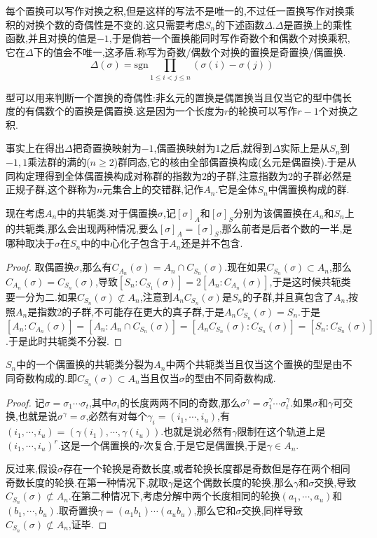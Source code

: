 每个置换可以写作对换之积,但是这样的写法不是唯一的,不过任一置换写作对换乘积的对换个数的奇偶性是不变的.这只需要考虑$S_n$的下述函数$\Delta$.$\Delta$是置换上的乘性函数,并且对换的值是$-1$,于是倘若一个置换能同时写作奇数个和偶数个对换乘积,它在$\Delta$下的值会不唯一,这矛盾.称写为奇数/偶数个对换的置换是奇置换/偶置换.
$$\Delta(\sigma)=\mathrm{sgn}\prod_{1\le i<j\le n}(\sigma(i)-\sigma(j))$$

型可以用来判断一个置换的奇偶性:非幺元的置换是偶置换当且仅当它的型中偶长度的有偶数个的置换是偶置换.这是因为一个长度为$r$的轮换可以写作$r-1$个对换之积.

事实上在得出$\Delta$把奇置换映射为$-1$,偶置换映射为1之后,就得到$\Delta$实际上是从$S_n$到${-1,1}$乘法群的满的($n\ge2$)群同态,它的核由全部偶置换构成(幺元是偶置换).于是从同构定理得到全体偶置换构成对称群的指数为2的子群,注意指数为2的子群必然是正规子群,这个群称为$n$元集合上的交错群,记作$A_n$.它是全体$S_n$中偶置换构成的群.

现在考虑$A_n$中的共轭类.对于偶置换$\sigma$,记$[\sigma]_A$和$[\sigma]_S$分别为该偶置换在$A_n$和$S_n$上的共轭类,那么会出现两种情况,要么$[\sigma]_A=[\sigma]_S$,那么前者是后者个数的一半,是哪种取决于$\sigma$在$S_n$中的中心化子包含于$A_n$还是并不包含.
\begin{proof}
	
	取偶置换$\sigma$,那么有$C_{A_n}(\sigma)=A_n\cap C_{S_n}(\sigma)$.现在如果$C_{S_n}(\sigma)\subset A_n$,那么$C_ {A_n}(\sigma)=C_{S_n}(\sigma)$,导致$[S_n:C_ {S_1}(\sigma)]=2[A_n:C_{A_n}(\sigma)]$,于是这时候共轭类要一分为二.如果$C_{S_n}(\sigma)\not\subset A_n$,注意到$A_nC_ {S_n}(\sigma)$是$S_n$的子群,并且真包含了$A_n$,按照$A_n$是指数2的子群,不可能存在更大的真子群,于是$A_nC_{S_n}(\sigma)=S_n$.于是$[A_n:C_ {A_n}(\sigma)]=[A_n:A_n\cap C_{S_n}(\sigma)]=[A_nC_{S_n}(\sigma):C_{S_n}(\sigma)]=[S_n:C_{S_n}(\sigma)]$.于是此时共轭类不分裂.
\end{proof}

$S_n$中的一个偶置换的共轭类分裂为$A_n$中两个共轭类当且仅当这个置换的型是由不同奇数构成的.即$C_{S_n}(\sigma)\subset A_n$当且仅当$\sigma$的型由不同奇数构成.
\begin{proof}
	
	记$\sigma=\sigma_1\cdots\sigma_t$,其中$\sigma_i$的长度两两不同的奇数,那么$\sigma^ {\gamma}=\sigma_1^{\gamma}\cdots\sigma_t^{\gamma}$.如果$\sigma$和$\gamma$可交换,也就是说$\sigma^{\gamma}=\sigma$,必然有对每个$\gamma_i= (i_1,\cdots,i_u)$,有$(i_1,\cdots,i_u)=(\gamma(i_1),\cdots,\gamma(i_u))$.也就是说必然有$\gamma$限制在这个轨道上是$(i_1,\cdots,i_u)^{r}$.这是一个偶置换的$r$次复合,于是它是偶置换,于是$\gamma\in A_n$.
	
	反过来,假设$\sigma$存在一个轮换是奇数长度,或者轮换长度都是奇数但是存在两个相同奇数长度的轮换.在第一种情况下,就取$\gamma$是这个偶数长度的轮换,那么$\gamma$和$\sigma$交换,导致$C_{S_n}(\sigma)\not\subset A_n$.在第二种情况下,考虑分解中两个长度相同的轮换$(a_1,\cdots,a_u)$和$(b_1,\cdots,b_u)$.取奇置换$\gamma= (a_1b_1)\cdots(a_ub_u)$,那么它和$\sigma$交换,同样导致$C_ {S_n}(\sigma)\not\subset A_n$,证毕.
\end{proof}

